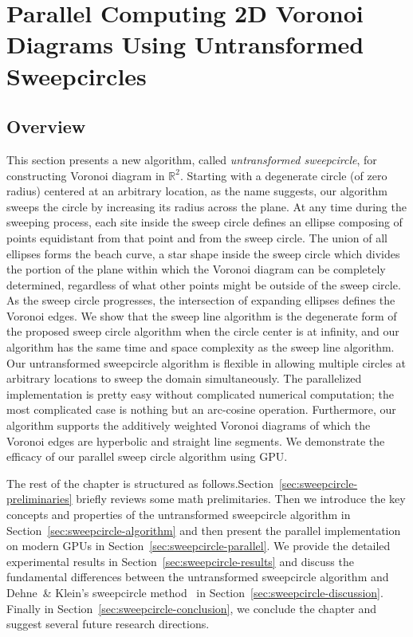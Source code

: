 \chapter{Parallel Computing 2D Voronoi Diagrams Using Untransformed Sweepcircles}

\section{Overview} \label{sec:sweepcircle-overview}

This section presents a new algorithm, called {\em
untransformed sweepcircle}, for constructing Voronoi diagram in
$\mathbb{R}^2$. Starting with a degenerate circle (of zero radius)
centered at an arbitrary location, as the name suggests, our
algorithm sweeps the circle by increasing its radius across the
plane. At any time during the sweeping process, each site inside the
sweep circle defines an ellipse composing of points equidistant from
that point and from the sweep circle. The union of all ellipses
forms the beach curve, a star shape inside the sweep circle which
divides the portion of the plane within which the Voronoi diagram
can be completely determined, regardless of what other points might
be outside of the sweep circle. As the sweep circle progresses, the
intersection of expanding ellipses defines the Voronoi edges. We
show that the sweep line algorithm is the degenerate form of the
proposed sweep circle algorithm when the circle center is at
infinity, and our algorithm has the same time and space complexity
as the sweep line algorithm. Our untransformed sweepcircle algorithm
is flexible in allowing multiple circles at arbitrary locations to
sweep the domain simultaneously. The parallelized implementation is
pretty easy without complicated numerical computation; the most
complicated case is nothing but an arc-cosine operation.
Furthermore, our algorithm supports the additively weighted Voronoi
diagrams of which the Voronoi edges are hyperbolic and straight line
segments. We demonstrate the efficacy of our parallel sweep circle
algorithm using GPU.


The rest of the chapter is structured as follows.Section~\ref{sec:sweepcircle-preliminaries} briefly reviews some math prelimitaries.
Then we introduce the key concepts and properties of the untransformed sweepcircle algorithm in
Section~\ref{sec:sweepcircle-algorithm} and then present the parallel implementation on modern GPUs in Section~\ref{sec:sweepcircle-parallel}.
We provide the detailed experimental results in Section~\ref{sec:sweepcircle-results} and discuss the fundamental differences between
the untransformed sweepcircle algorithm and Dehne~\& Klein's sweepcircle method~\cite{Dehne_Klein:1987} in Section~\ref{sec:sweepcircle-discussion}.
Finally in Section~\ref{sec:sweepcircle-conclusion}, we conclude the chapter and suggest several future research directions.

